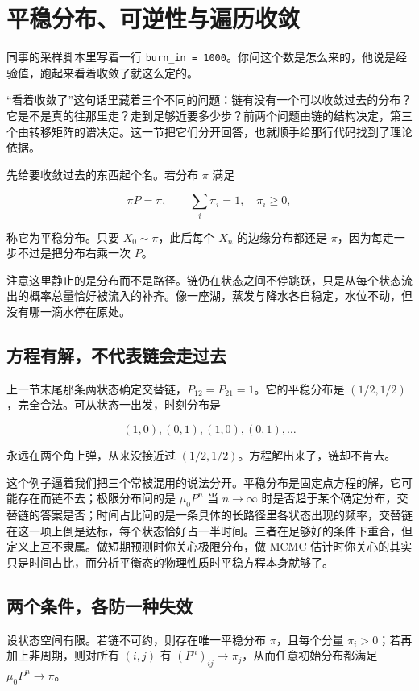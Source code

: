\section{平稳分布、可逆性与遍历收敛}
\label{sec:06-Random-Processes/03-Markov-Chains/04}

同事的采样脚本里写着一行 \texttt{burn\_in = 1000}。你问这个数是怎么来的，他说是经验值，跑起来看着收敛了就这么定的。

``看着收敛了''这句话里藏着三个不同的问题：链有没有一个可以收敛过去的分布？它是不是真的往那里走？走到足够近要多少步？前两个问题由链的结构决定，第三个由转移矩阵的谱决定。这一节把它们分开回答，也就顺手给那行代码找到了理论依据。

先给要收敛过去的东西起个名。若分布 \(\pi\) 满足

\[
\pi P=\pi,\qquad \sum_i\pi_i=1,\quad \pi_i\ge0,
\]

称它为平稳分布。只要 \(X_0\sim\pi\)，此后每个 \(X_n\) 的边缘分布都还是 \(\pi\)，因为每走一步不过是把分布右乘一次 \(P\)。

注意这里静止的是分布而不是路径。链仍在状态之间不停跳跃，只是从每个状态流出的概率总量恰好被流入的补齐。像一座湖，蒸发与降水各自稳定，水位不动，但没有哪一滴水停在原处。

\subsection{方程有解，不代表链会走过去}

上一节末尾那条两状态确定交替链，\(P_{12}=P_{21}=1\)。它的平稳分布是 \((1/2,1/2)\)，完全合法。可从状态一出发，时刻分布是

\[
(1,0),(0,1),(1,0),(0,1),\ldots
\]

永远在两个角上弹，从来没接近过 \((1/2,1/2)\)。方程解出来了，链却不肯去。

这个例子逼着我们把三个常被混用的说法分开。平稳分布是固定点方程的解，它可能存在而链不去；极限分布问的是 \(\mu_0P^n\) 当 \(n\to\infty\) 时是否趋于某个确定分布，交替链的答案是否；时间占比问的是一条具体的长路径里各状态出现的频率，交替链在这一项上倒是达标，每个状态恰好占一半时间。三者在足够好的条件下重合，但定义上互不隶属。做短期预测时你关心极限分布，做 MCMC 估计时你关心的其实只是时间占比，而分析平衡态的物理性质时平稳方程本身就够了。

\subsection{两个条件，各防一种失效}

\begin{theorem}[有限链的收敛定理]
设状态空间有限。若链不可约，则存在唯一平稳分布 \(\pi\)，且每个分量 \(\pi_i>0\)；若再加上非周期，则对所有 \((i,j)\) 有 \((P^n)_{ij}\to\pi_j\)，从而任意初始分布都满足 \(\mu_0P^n\to\pi\)。
\end{theorem}

